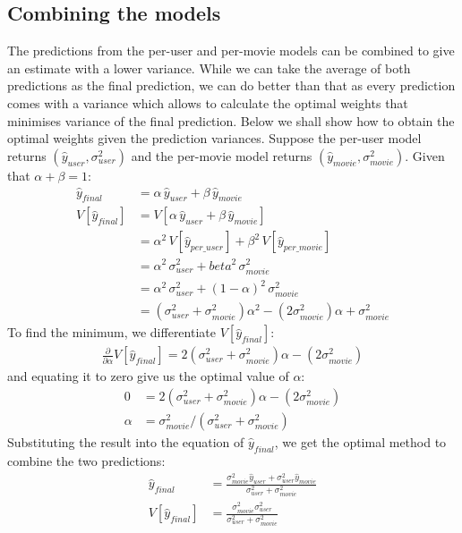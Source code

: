 \documentclass[letterpaper]{article}
\begin{document}
\subsection{Combining the models}
The predictions from the per-user and per-movie models can be combined to give an estimate with a lower variance.
While we can take the average of both predictions as the final prediction, we can do better than that as every prediction comes with a variance which allows to calculate the optimal weights that minimises variance of the final prediction. Below we shall show how to obtain the optimal weights given the prediction variances. Suppose the per-user model returns $(\widehat{y}_{user}, \sigma^{2}_{user})$ and the per-movie model returns $(\widehat{y}_{movie},\sigma^{2}_{movie})$. Given that $\alpha + \beta = 1$:
\begin{align*}
	 \widehat{y}_{final} &= \alpha\,\widehat{y}_{user} + \beta\,\widehat{y}_{movie} \\
	 V[\widehat{y}_{final}] &= V[\alpha\,\widehat{y}_{user} + \beta\,\widehat{y}_{movie}]\\
	&= \alpha^{2}\,V[\widehat{y}_{per\_user}] + \beta^{2}\,V[\widehat{y}_{per\_movie}] \\
	&= \alpha^{2}\,\sigma^{2}_{user} + beta^{2}\,\sigma^{2}_{movie}\\
	&= \alpha^{2}\,\sigma^{2}_{user} + (1-\alpha)^{2}\,\sigma^{2}_{movie}\\
	&= (\sigma^{2}_{user}+\sigma^{2}_{movie})\alpha^{2}-(2\sigma^{2}_{movie})\alpha+\sigma^{2}_{movie}
\end{align*}
To find the minimum, we differentiate $V[\widehat{y}_{final}]$:
\begin{align*}
\frac{\partial}{\partial\alpha}V[\widehat{y}_{final}] = 2(\sigma^{2}_{user}+\sigma^{2}_{movie})\alpha-(2\sigma^{2}_{movie})
\end{align*}
and equating it to zero give us the optimal value of $\alpha$:
\begin{align*}
0&=2(\sigma^{2}_{user}+\sigma^{2}_{movie})\alpha-(2\sigma^{2}_{movie})\\
\alpha&=\sigma^{2}_{movie}/(\sigma^{2}_{user}+\sigma^{2}_{movie})
\end{align*}
Substituting the result into the equation of $\widehat{y}_{final}$, we get the optimal method to combine the two predictions:
\begin{align*}
\widehat{y}_{final} &=\frac{\sigma^{2}_{movie}\widehat{y}_{user} + \sigma^{2}_{user}\widehat{y}_{movie}}{\sigma^{2}_{user}+\sigma^{2}_{movie}}\\
V[\widehat{y}_{final}]&=\frac{\sigma^{2}_{movie}\sigma^{2}_{user}}{\sigma^{2}_{user}+\sigma^{2}_{movie}}
\end{align*}
\end{document}
